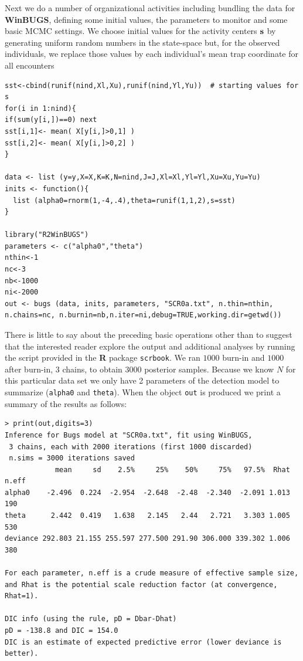 Next we do a number of organizational activities including bundling
the data for {\bf WinBUGS}, defining some initial values, the parameters to
monitor and some basic MCMC settings.  We choose initial values for
the activity centers ${\bf s}$ by generating uniform random numbers in
the state-space but, for the observed individuals, we replace those
values by each individual's mean trap coordinate for all encounters
\begin{verbatim}
sst<-cbind(runif(nind,Xl,Xu),runif(nind,Yl,Yu))  # starting values for s
for(i in 1:nind){
if(sum(y[i,])==0) next
sst[i,1]<- mean( X[y[i,]>0,1] )
sst[i,2]<- mean( X[y[i,]>0,2] )
}

data <- list (y=y,X=X,K=K,N=nind,J=J,Xl=Xl,Yl=Yl,Xu=Xu,Yu=Yu)
inits <- function(){
  list (alpha0=rnorm(1,-4,.4),theta=runif(1,1,2),s=sst)
}

library("R2WinBUGS")
parameters <- c("alpha0","theta")
nthin<-1
nc<-3
nb<-1000
ni<-2000
out <- bugs (data, inits, parameters, "SCR0a.txt", n.thin=nthin,
n.chains=nc, n.burnin=nb,n.iter=ni,debug=TRUE,working.dir=getwd())
\end{verbatim}

There is little to say about the preceding basic operations other than
to suggest that the interested reader explore the output and
additional analyses by running the script provided in the {\bf R}
package \mbox{\tt scrbook}.
 We ran $1000$ burn-in and $1000$ after burn-in, 3 chains,
to obtain 3000 posterior samples.  Because we know $N$ for this
particular data set we only have 2 parameters of the detection model
to summarize (\mbox{\tt alpha0} and \mbox{\tt theta}).  When the
object \mbox{\tt out} is produced we print a summary of the results as
follows:
{\small
\begin{verbatim}
> print(out,digits=3)
Inference for Bugs model at "SCR0a.txt", fit using WinBUGS,
 3 chains, each with 2000 iterations (first 1000 discarded)
 n.sims = 3000 iterations saved
            mean     sd    2.5%     25%    50%     75%   97.5%  Rhat n.eff
alpha0    -2.496  0.224  -2.954  -2.648  -2.48  -2.340  -2.091 1.013   190
theta      2.442  0.419   1.638   2.145   2.44   2.721   3.303 1.005   530
deviance 292.803 21.155 255.597 277.500 291.90 306.000 339.302 1.006   380

For each parameter, n.eff is a crude measure of effective sample size,
and Rhat is the potential scale reduction factor (at convergence, Rhat=1).

DIC info (using the rule, pD = Dbar-Dhat)
pD = -138.8 and DIC = 154.0
DIC is an estimate of expected predictive error (lower deviance is better).
\end{verbatim}
}

